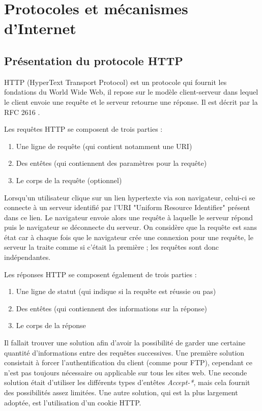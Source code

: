 \chapter{Protocoles et mécanismes d'Internet}

\section{Présentation du protocole HTTP}
HTTP (HyperText Transport Protocol) \cite{Obo_CNP3} est un protocole qui fournit les fondations du World Wide Web, il repose sur le modèle client-serveur dans lequel le client envoie une requête et le serveur retourne une réponse. Il est décrit par la RFC 2616 \cite{IETF_RFC2616}.
\newline

Les requêtes HTTP se composent de trois parties :
\begin{enumerate}
	\item Une ligne de requête (qui contient notamment une URI)
	\item Des entêtes (qui contiennent des paramètres pour la requête)
	\item Le corps de la requête (optionnel)
	\newline
\end{enumerate}

Lorsqu'un utilisateur clique sur un lien hypertexte via son navigateur, celui-ci se connecte à un serveur identifié par l'URI "Uniform Resource Identifier" présent dans ce lien. Le navigateur envoie alors une requête à laquelle le serveur répond puis le navigateur se déconnecte du serveur. On considère que la requête est sans état car à chaque fois que le navigateur crée une connexion pour une requête, le serveur la traite comme si c'était la première ; les requêtes sont donc indépendantes.
\newline

Les réponses HTTP se composent également de trois parties :
\begin{enumerate}
	\item Une ligne de statut (qui indique si la requête est réussie ou pas)
	\item Des entêtes (qui contiennent des informations sur la réponse)
	\item Le corps de la réponse
	\newline
\end{enumerate}

Il fallait trouver une solution afin d'avoir la possibilité de garder une certaine quantité d'informations entre des requêtes successives. Une première solution consistait à forcer l'authentification du client (comme pour FTP), cependant ce n'est pas toujours nécessaire ou applicable sur tous les sites web. Une seconde solution était d'utiliser les différents types d'entêtes \emph{Accept-*}, mais cela fournit des possibilités assez limitées. Une autre solution, qui est la plus largement adoptée, est l'utilisation d'un cookie HTTP.
\newline

